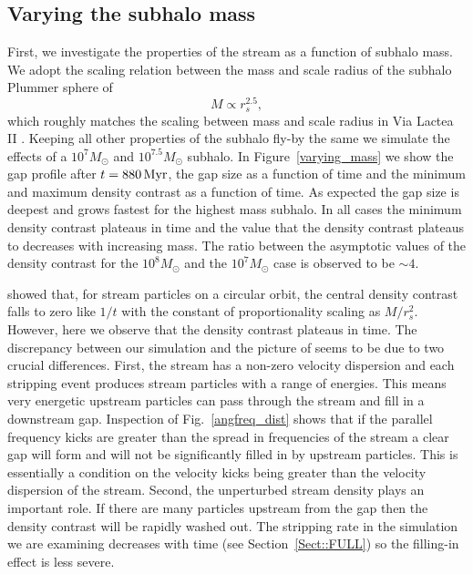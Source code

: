 \documentclass[useAMS,usenatbib,fleqn,a4paper]{mn2e}
\def\Myr{\,{\rm Myr}}
\begin{document}
\subsection{Varying the subhalo mass}
First, we investigate the properties of the stream as a function of subhalo mass. We adopt the scaling relation between the mass and scale radius of the subhalo Plummer sphere of
\begin{equation}
M\propto r_s^{2.5},
\end{equation}
which roughly matches the scaling between mass and scale radius in Via Lactea II \citep{Diemand2008}. Keeping all other properties of the subhalo fly-by the same we simulate the effects of a $10^7M_\odot$ and $10^{7.5}M_\odot$ subhalo. In Figure~\ref{varying_mass} we show the gap profile after $t=880\Myr$, the gap size as a function of time and the minimum and maximum density contrast as a function of time. As expected the gap size is deepest and grows fastest for the highest mass subhalo. In all cases the minimum density contrast plateaus in time and the value that the density contrast plateaus to decreases with increasing mass. The ratio between the asymptotic values of the density contrast for the $10^8M_\odot$ and the $10^7M_\odot$ case is observed to be $\sim4$.

\cite{ErkalBelokurov2015} showed that, for stream particles on a circular orbit, the central density contrast falls to zero like $1/t$ with the constant of proportionality scaling as $M/r_s^2$. However, here we observe that the density contrast plateaus in time. The discrepancy between our simulation and the picture of \cite{ErkalBelokurov2015} seems to be due to two crucial differences. First, the stream has a non-zero velocity dispersion and each stripping event produces stream particles with a range of energies. This means very energetic upstream particles can pass through the stream and fill in a downstream gap. Inspection of Fig.~\ref{angfreq_dist} shows that if the parallel frequency kicks are greater than the spread in frequencies of the stream a clear gap will form and will not be significantly filled in by upstream particles. This is essentially a condition on the velocity kicks being greater than the velocity dispersion of the stream. Second, the unperturbed stream density plays an important role. If there are many particles upstream from the gap then the density contrast will be rapidly washed out. The stripping rate in the simulation we are examining decreases with time (see Section~\ref{Sect::FULL}) so the filling-in effect is less severe.
\end{document}
